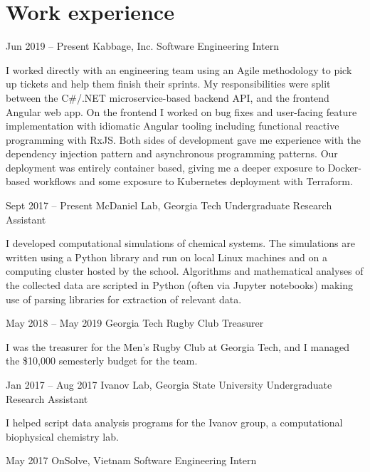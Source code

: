 \documentclass{tccv}
\begin{document}
\begin{minipage}[t]{0.65\textwidth}
\section{Work experience}

\begin{eventlist}

\item{Jun 2019 -- Present}
     {Kabbage, Inc.}
     {Software Engineering Intern}
     
    I worked directly with an engineering team using an Agile methodology to pick up tickets and help them finish their sprints. My responsibilities were split between the C\#/.NET microservice-based backend API, and the frontend Angular web app. On the frontend I worked on bug fixes and user-facing feature implementation with idiomatic Angular tooling including functional reactive programming with RxJS. Both sides of development gave me experience with the dependency injection pattern and asynchronous programming patterns. Our deployment was entirely container based, giving me a deeper exposure to Docker-based workflows and some exposure to Kubernetes deployment with Terraform.

\item{Sept 2017 -- Present}
     {McDaniel Lab, Georgia Tech}
     {Undergraduate Research Assistant}

    I developed computational simulations of chemical systems. The simulations are written using a Python library and run on local Linux machines and on a computing cluster hosted by the school. Algorithms and mathematical analyses of the collected data are scripted in Python (often via Jupyter notebooks) making use of parsing libraries for extraction of relevant data.
    
\item{May 2018 -- May 2019}
     {Georgia Tech Rugby Club}
     {Treasurer}
     
    I was the treasurer for the Men’s Rugby Club at Georgia Tech, and I managed the \$10,000 semesterly budget for the team. 

\item{Jan 2017 -- Aug 2017}
     {Ivanov Lab, Georgia State University}
     {Undergraduate Research Assistant}

    I helped script data analysis programs for the Ivanov group, a computational biophysical chemistry lab.

\item{May 2017}
     {OnSolve, Vietnam}
     {Software Engineering Intern}


\end{eventlist}
\end{minipage}
\end{document}

